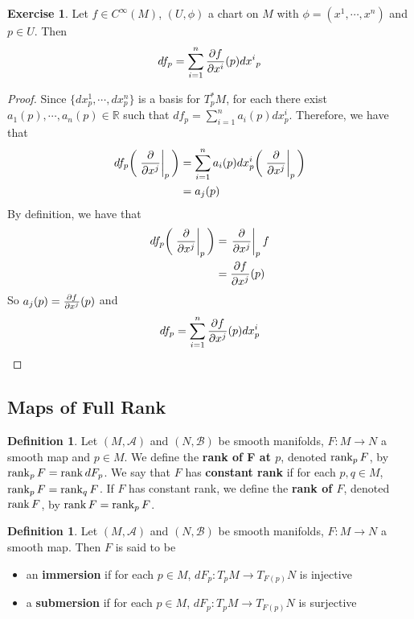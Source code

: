 \documentclass[12pt]{amsart}
\theoremstyle{definition}
\newtheorem{defn}[definition]{Definition}
\newtheorem{ex}[definition]{Exercise}
\newcommand{\R}{\mathbb{R}}
\newcommand{\MA}{\mathcal{A}}
\newcommand{\MB}{\mathcal{B}}
\begin{document}
	\begin{ex}
		Let $f \in C^{\infty}(M)$, $(U, \phi)$ a chart on $M$ with $\phi = (x^1, \cdots, x^n)$ and $p \in U$. Then $$df_p = \sum_{i=1}^n {\pdv{f}{x^i}}(p) {dx^i}_p$$
	\end{ex}

	\begin{proof}
		 Since $\{dx^1_p, \cdots, dx^n_p\}$ is a basis for $T^*_pM$, for each there exist $a_1(p), \cdots, a_n(p) \in \R$ such that $df_p = \sum\limits_{i=1}^n a_i(p)dx^i_p$. Therefore, we have that 
		\begin{align*}
			df_p \bigg(\eval{\pdv{x^j}}_{p} \bigg) 
			&= \sum\limits_{i=1}^n a_i(p)dx^i_p \bigg(\eval{\pdv{x^j}}_{p} \bigg)  \\
			&=  a_j(p)
		\end{align*}
		By definition, we have that 
		\begin{align*}
			df_p\bigg(\eval{\pdv{x^j}}_{p} \bigg) 
			&= \eval{\pdv{x^j}}_{p} f \\ 
			&= {\pdv{f}{x^j}}(p)\\
		\end{align*}
		So $a_j(p) = {\pdv{f}{x^j}}(p)$ and $$df_p = \sum\limits_{i=1}^n {\pdv{f}{x^j}}(p)dx^i_p$$
	\end{proof}
		
	
	
	
	
	
	
	
	
	
	
	
	
	
	
	
	
	
	
	\newpage
	\subsection{Maps of Full Rank}
	
	\begin{defn}
		Let $(M, \MA)$ and $(N, \MB)$ be smooth manifolds, $F: M \rightarrow N$ a smooth map and $p \in M$. We define the \textbf{rank of F at $p$}, denoted $\rank_p F$, by $\rank_p F = \rank dF_p$. We say that $F$ has \textbf{constant rank} if for each $p, q \in M$, $\rank_p F = \rank_q F$. If $F$ has constant rank, we define the \textbf{rank of $F$}, denoted $\rank F$, by $\rank F = \rank_p F$.
		
	\end{defn}
	
	\begin{defn}
		Let $(M, \MA)$ and $(N, \MB)$ be smooth manifolds, $F: M \rightarrow N$ a smooth map. Then $F$ is said to be 
		\begin{itemize}
		
			\item an \textbf{immersion} if for each $p \in M$, $dF_p:T_pM\rightarrow T_{F(p)}N$ is injective
			\item a \textbf{submersion} if for each $p \in M$, $dF_p:T_pM\rightarrow T_{F(p)}N$ is surjective
		\end{itemize}
	\end{defn}
	
\end{document}
